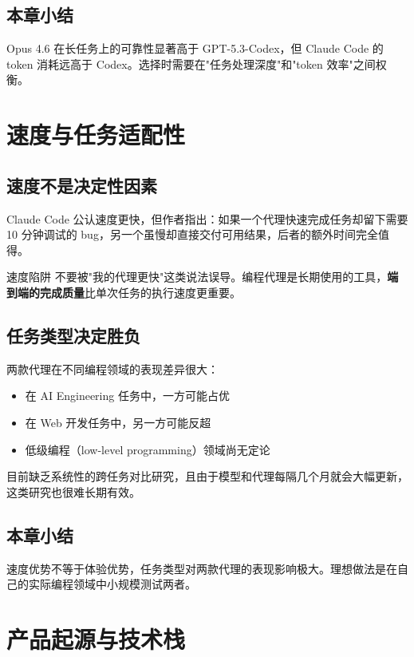 \documentclass[a4paper]{article}
\begin{document}
\subsection{本章小结}

Opus 4.6 在长任务上的可靠性显著高于 GPT-5.3-Codex，但 Claude Code 的 token 消耗远高于 Codex。选择时需要在"任务处理深度"和"token 效率"之间权衡。

\section{速度与任务适配性}

\subsection{速度不是决定性因素}

Claude Code 公认速度更快，但作者指出：如果一个代理快速完成任务却留下需要 10 分钟调试的 bug，另一个虽慢却直接交付可用结果，后者的额外时间完全值得。

\begin{warningbox}{速度陷阱}
不要被"我的代理更快"这类说法误导。编程代理是长期使用的工具，\textbf{端到端的完成质量}比单次任务的执行速度更重要。
\end{warningbox}

\subsection{任务类型决定胜负}

两款代理在不同编程领域的表现差异很大：

\begin{itemize}
    \item 在 AI Engineering 任务中，一方可能占优
    \item 在 Web 开发任务中，另一方可能反超
    \item 低级编程（low-level programming）领域尚无定论
\end{itemize}

目前缺乏系统性的跨任务对比研究，且由于模型和代理每隔几个月就会大幅更新，这类研究也很难长期有效。

\subsection{本章小结}

速度优势不等于体验优势，任务类型对两款代理的表现影响极大。理想做法是在自己的实际编程领域中小规模测试两者。

\section{产品起源与技术栈}
\end{document}
